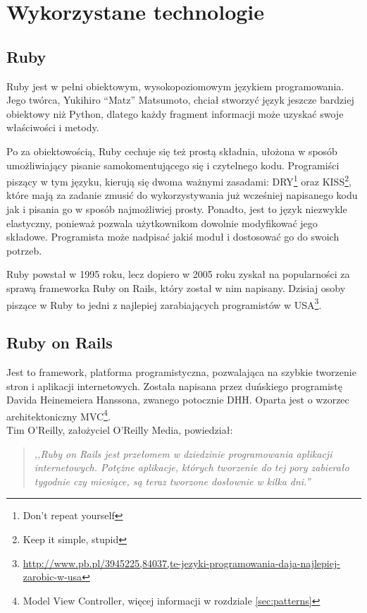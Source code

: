 \section{Wykorzystane technologie}
  \subsection{Ruby}
  Ruby jest w pełni obiektowym, wysokopoziomowym językiem programowania. Jego twórca, Yukihiro “Matz” Matsumoto, chciał stworzyć język jeszcze bardziej obiektowy niż Python, dlatego każdy fragment informacji może uzyskać swoje właściwości i metody.

  Po za obiektowością, Ruby cechuje się też prostą składnia, ułożona w sposób umożliwiający pisanie samokomentującego się i czytelnego kodu. Programiści piszący w tym języku, kierują się dwoma ważnymi zasadami: DRY\footnote{Don't repeat yourself\cite{programming_ruby}} oraz KISS\footnote{Keep it simple, stupid\cite{programming_ruby}}, które mają za zadanie zmusić do wykorzystywania już wcześniej napisanego kodu jak i pisania go w sposób najmożliwiej prosty. Ponadto, jest to język niezwykle elastyczny, ponieważ pozwala użytkownikom dowolnie modyfikować jego składowe. Programista może nadpisać jakiś moduł i dostosować go do swoich potrzeb.

  Ruby powstał w 1995 roku, lecz dopiero w 2005 roku zyskał na popularności za sprawą frameworka Ruby on Rails, który został w nim napisany. Dzisiaj osoby piszące w Ruby to jedni z najlepiej zarabiających programistów w USA\footnote{\url{http://www.pb.pl/3945225,84037,te-jezyki-programowania-daja-najlepiej-zarobic-w-usa}}.

  \subsection{Ruby on Rails}
  Jest to framework, platforma programistyczna, pozwalająca na szybkie tworzenie stron i aplikacji internetowych. Została napisana przez duńskiego programistę Davida Heinemeiera Hanssona, zwanego potocznie DHH. Oparta jest o wzorzec architektoniczny MVC\footnote{Model View Controller, więcej informacji w rozdziale \ref{sec:patterns}}. \\
  Tim O'Reilly, założyciel O'Reilly Media, powiedział:
  \begin{quote}
    \emph{,,Ruby on Rails jest przełomem w dziedzinie programowania aplikacji internetowych.
    Potężne aplikacje, których tworzenie do tej pory zabierało tygodnie czy miesiące, są teraz tworzone dosłownie w kilka dni.”}
  \end{quote}

